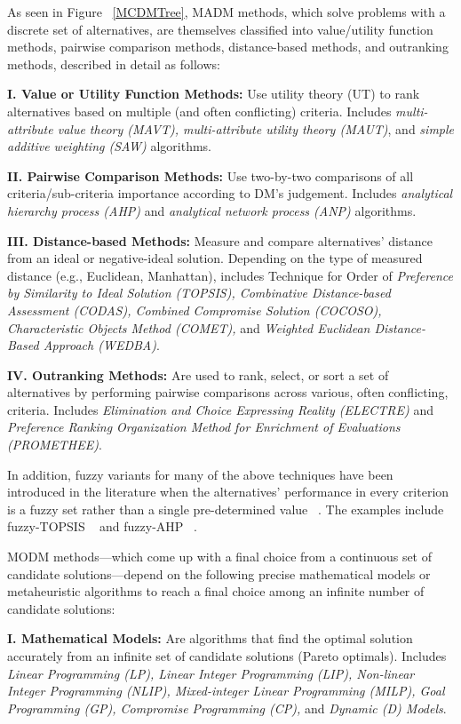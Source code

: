 \documentclass{sfuthesis}
\begin{document}
As seen in Figure ~\ref{MCDMTree}, MADM methods, which solve problems with a discrete set of alternatives, are themselves classified into value/utility function methods, pairwise comparison methods, distance-based methods, and outranking methods, described in detail as follows:\par
\textbf{I. Value or Utility Function Methods:} Use utility theory (UT) to rank alternatives based on multiple (and often conflicting) criteria. Includes \textit{multi-attribute value theory (MAVT), multi-attribute utility theory (MAUT)}, and \textit{simple additive weighting (SAW)} algorithms.\par
\textbf{II. Pairwise Comparison Methods:} Use two-by-two comparisons of all criteria/sub-criteria importance according to DM’s judgement. Includes \textit{analytical hierarchy process (AHP)} and \textit{analytical network process (ANP)} algorithms. \par
\textbf{III. Distance-based Methods:} Measure and compare alternatives’ distance from an ideal or negative-ideal solution. Depending on the type of measured distance (e.g., Euclidean, Manhattan), includes Technique for Order of \textit{Preference by Similarity to Ideal Solution (TOPSIS), Combinative Distance-based Assessment (CODAS), Combined Compromise Solution (COCOSO), Characteristic Objects Method (COMET),} and \textit{Weighted Euclidean Distance-Based Approach (WEDBA)}.\par
\textbf{IV. Outranking Methods:} Are used to rank, select, or sort a set of alternatives by performing pairwise comparisons across various, often conflicting, criteria. Includes \textit{Elimination and Choice Expressing Reality (ELECTRE)} and \textit{Preference Ranking Organization Method for Enrichment of Evaluations (PROMETHEE)}.\par
In addition, fuzzy variants for many of the above techniques have been introduced in the literature when the alternatives’ performance in every criterion is a fuzzy set rather than a single pre-determined value ~\cite{aouam2003fuzzy}. The examples include fuzzy-TOPSIS ~\cite{nadaban_fuzzy_2016} and fuzzy-AHP ~\cite{chang1996applications}.\par
MODM methods—which come up with a final choice from a continuous set of candidate solutions—depend on the following precise mathematical models or metaheuristic algorithms to reach a final choice among an infinite number of candidate solutions:\par
\textbf{I. Mathematical Models:} Are algorithms that find the optimal solution accurately from an infinite set of candidate solutions (Pareto optimals). Includes \textit{Linear Programming (LP), Linear Integer Programming (LIP), Non-linear Integer Programming (NLIP), Mixed-integer Linear Programming (MILP), Goal Programming (GP), Compromise Programming (CP),} and \textit{Dynamic (D) Models}.\par
\end{document}
